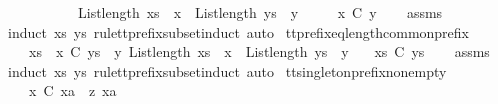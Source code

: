 \begin{isabellebody}
\ \ \ \ \ \ \ \ \ \ {\isachardoublequoteopen}List{\isachardot}length\ {\isacharparenleft}xs\ {\isacharat}\ {\isacharbrackleft}x{\isacharbrackright}{\isacharparenright}\ {\isacharequal}\ List{\isachardot}length\ {\isacharparenleft}ys\ {\isacharat}\ {\isacharbrackleft}y{\isacharbrackright}{\isacharparenright}{\isachardoublequoteclose}\isanewline
\ \ \ \ \ {\isachardoublequoteopen}{\isacharbrackleft}x{\isacharbrackright}\ {\isasymlesssim}\isactrlsub C\ {\isacharbrackleft}y{\isacharbrackright}{\isachardoublequoteclose}\isanewline
%
\isadelimproof
\ \ %
\endisadelimproof
%
\isatagproof
{}\isamarkupfalse%
\ assms\ \isamarkupfalse%
{\isacharparenleft}induct\ xs\ ys\ rule{\isacharcolon}tt{\isacharunderscore}prefix{\isacharunderscore}subset{\isachardot}induct{\isacharcomma}\ auto{\isacharparenright}%
\endisatagproof
{\isafoldproof}%
%
\isadelimproof
\isanewline
%
\endisadelimproof
\isanewline
{}\isamarkupfalse%
\ tt{\isacharunderscore}prefix{\isacharunderscore}eq{\isacharunderscore}length{\isacharunderscore}common{\isacharunderscore}prefix{\isacharcolon}\isanewline
\ \ \ {\isachardoublequoteopen}xs\ {\isacharat}\ {\isacharbrackleft}x{\isacharbrackright}\ {\isasymlesssim}\isactrlsub C\ ys\ {\isacharat}\ {\isacharbrackleft}y{\isacharbrackright}{\isachardoublequoteclose}\ {\isachardoublequoteopen}List{\isachardot}length\ {\isacharparenleft}xs\ {\isacharat}\ {\isacharbrackleft}x{\isacharbrackright}{\isacharparenright}\ {\isacharequal}\ List{\isachardot}length\ {\isacharparenleft}ys\ {\isacharat}\ {\isacharbrackleft}y{\isacharbrackright}{\isacharparenright}{\isachardoublequoteclose}\isanewline
\ \ \ {\isachardoublequoteopen}xs\ {\isasymlesssim}\isactrlsub C\ ys{\isachardoublequoteclose}\isanewline
%
\isadelimproof
\ \ %
\endisadelimproof
%
\isatagproof
{}\isamarkupfalse%
\ assms\ \isamarkupfalse%
{\isacharparenleft}induct\ xs\ ys\ rule{\isacharcolon}tt{\isacharunderscore}prefix{\isacharunderscore}subset{\isachardot}induct{\isacharcomma}\ auto{\isacharparenright}%
\endisatagproof
{\isafoldproof}%
%
\isadelimproof
\isanewline
%
\endisadelimproof
\isanewline
{}\isamarkupfalse%
\ tt{\isacharunderscore}singleton{\isacharunderscore}prefix{\isacharunderscore}nonempty{\isacharcolon}\isanewline
\ \ \ {\isachardoublequoteopen}{\isacharbrackleft}x{\isacharbrackright}\ {\isasymlesssim}\isactrlsub C\ xa\ {\isacharat}\ z{\isachardoublequoteclose}\ {\isachardoublequoteopen}xa\ {\isasymnoteq}\ {\isacharbrackleft}{\isacharbrackright}{\isachardoublequoteclose}\isanewline

\end{isabellebody}

